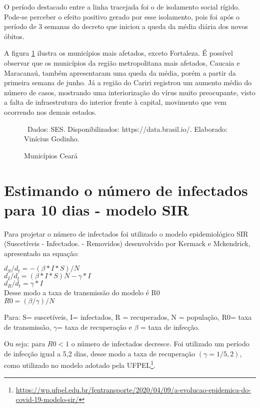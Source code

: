 \documentclass[a4paper,12pt,oneside,titlepage]{article}
\begin{document}
O período destacado entre a linha tracejada foi o de isolamento social rígido. Pode-se perceber o efeito positivo gerado por esse isolamento, pois foi após o período de 3 semanas do decreto que iniciou a queda da média diária dos novos óbitos.

A figura \ref{g2} ilustra os municípios mais afetados, exceto Fortaleza. É possível observar que os municípios da região metropolitana mais afetados, Caucaia e Maracanaú, também apresentaram uma queda da média, porém a partir da primeira semana de junho. Já a região do Cariri registrou um aumento médio do número de casos, mostrando uma interiorização do vírus muito preocupante, visto a falta de infraestrutura do interior frente à capital, movimento que vem ocorrendo nos demais estados.	
	
	\begin{figure}[H]
		\centering
		\caption{Municípios Ceará}
		
		\label{g2}
		\ \footnotesize Dados: SES. Disponibilizados: https://data.brasil.io/. Elaborado: Vinícius Godinho. 
		
	\end{figure}
	

\section{Estimando o número de infectados para 10 dias - modelo SIR}

Para projetar o número de infectados foi utilizado o modelo epidemiológico SIR (Suscetíveis - Infectados. - Removidos) desenvolvido por Kermack e Mckendrick, apresentado na equação:

\begin{center}
	

$d_S/d_t=-(\beta*I*S)/N$ \\
$d_I/d_t=(\beta*I*S)N  - \gamma *I$ \\
$d_R/d_t=\gamma*I$ \\

Desse modo a taxa de transmissão do modelo é R0 \\

$R0=(\beta/\gamma)/N$


\end{center}


Para: S= suscetíveis, I= infectados, R = recuperados, N = população, R0= taxa de transmissão, $\gamma$= taxa de recuperação e $\beta$ = taxa de infecção.


Ou seja: para $R0 < 1$ o número de infectados decresce. Foi utilizado um período de infecção igual a 5,2 dias, desse modo a taxa de recuperação $(\gamma=1/5,2)$, como utilizado no modelo adotado pela UFPEL\footnote{ \url{https://wp.ufpel.edu.br/fentransporte/2020/04/09/a-evolucao-epidemica-do-covid-19-modelo-sir/}}. 
\end{document}
